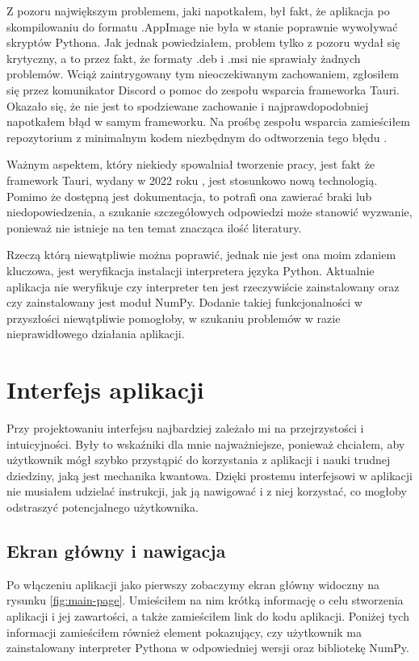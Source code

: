 \documentclass{SGGW-thesis}
\begin{document}
	Z pozoru największym problemem, jaki napotkałem, był fakt, że aplikacja po skompilowaniu do formatu .AppImage nie była w stanie poprawnie wywoływać skryptów Pythona. Jak jednak powiedziałem, problem tylko z pozoru wydał się krytyczny, a to przez fakt, że formaty .deb i .msi nie sprawiały żadnych problemów. Wciąż zaintrygowany tym nieoczekiwanym zachowaniem, zgłosiłem się przez komunikator Discord o pomoc do zespołu wsparcia frameworka Tauri. Okazało się, że nie jest to spodziewane zachowanie i najprawdopodobniej napotkałem błąd w samym frameworku. Na prośbę zespołu wsparcia zamieściłem repozytorium z minimalnym kodem niezbędnym do odtworzenia tego błędu \cite{app-error-repo}.
	
	Ważnym aspektem, który niekiedy spowalniał tworzenie pracy, jest fakt że framework Tauri, wydany w 2022 roku \cite{tauri-release}, jest stosunkowo nową technologią. Pomimo że dostępną jest dokumentacja, to potrafi ona zawierać braki lub niedopowiedzenia, a szukanie szczegółowych odpowiedzi może stanowić wyzwanie, ponieważ nie istnieje na ten temat znacząca ilość literatury.
	
	Rzeczą którą niewątpliwie można poprawić, jednak nie jest ona moim zdaniem kluczowa, jest weryfikacja instalacji interpretera języka Python. Aktualnie aplikacja nie weryfikuje czy interpreter ten jest rzeczywiście zainstalowany oraz czy zainstalowany jest moduł NumPy. Dodanie takiej funkcjonalności w przyszłości niewątpliwie pomogłoby, w szukaniu problemów w razie nieprawidłowego działania aplikacji.
	

\chapter{Interfejs aplikacji}
	Przy projektowaniu interfejsu najbardziej zależało mi na przejrzystości i intuicyjności. Były to wskaźniki dla mnie najważniejsze, ponieważ chciałem, aby użytkownik mógł szybko przystąpić do korzystania z aplikacji i nauki trudnej dziedziny, jaką jest mechanika kwantowa. Dzięki prostemu interfejsowi w aplikacji nie musiałem udzielać instrukcji, jak ją nawigować i z niej korzystać, co mogłoby odstraszyć potencjalnego użytkownika.
	\section{Ekran główny i nawigacja}
	Po włączeniu aplikacji jako pierwszy zobaczymy ekran główny widoczny na rysunku  \ref{fig:main-page}. Umieściłem na nim krótką informację o celu stworzenia aplikacji i jej zawartości, a także zamieściłem link do kodu aplikacji. Poniżej tych informacji zamieściłem również element pokazujący, czy użytkownik ma zainstalowany interpreter Pythona w odpowiedniej wersji oraz bibliotekę NumPy.
	
\end{document}
